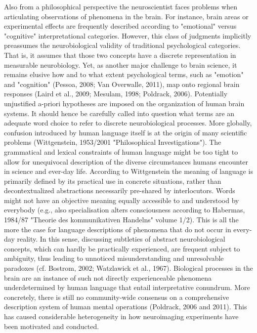 \documentclass[authoryear,review,3p]{elsarticle}
\begin{document}
Also from a philosophical perspective
the neuroscientist faces problems when articulating observations of
phenomena in the brain.
%
For instance, brain areas or experimental effects are frequently
described according to "emotional" versus "cognitive"
interpretational categories.
However, this class of judgments implicitly preassumes
the neurobiological validity of traditional psychological categories.
That is, it assumes that those two concepts have
a discrete representation in measurable neurobiology.
Yet, as another major challenge to brain science,
it remains elusive how and to what extent psychological terms,
such as "emotion" and "cognition" (Pessoa, 2008; Van Overwalle, 2011),
map onto regional brain responses
(Laird et al., 2009; Mesulam, 1998; Poldrack, 2006). 
Potentially unjustified a-priori hypotheses are imposed
on the organization of human brain systems.
%
It should hence be carefully called into question what terms
are an adequate word choice to refer to discrete
neurobiological processes.
More globally,
confusion introduced by human language itself is at the origin
of many scientific problems
(Wittgenstein, 1953/2001 "Philosophical Investigations").
The grammatical and lexical constraints of human language might be
too tight to allow for unequivocal description of the diverse
circumstances humans encounter in science and ever-day life.
According to Wittgenstein the meaning of language is primarily
defined by its practical use in concrete situations,
rather than decontextualized abstractions necessarily pre-shared
by interlocutors.
Words might not have an objective meaning
equally accessible to and understood by everybody
(e.g., also specialisation alters consciousness according to
Habermas, 1984/87 "Theorie des kommunikativen Handelns" volume 1/2).
This is all the more the case for language descriptions
of phenomena that do not occur in every-day reality.
In this sense,
discussing subtleties of abstract neurobiological concepts,
which can hardly be practically experienced,
are frequent subject to ambiguity, thus leading to
unnoticed misunderstanding and unresolvable paradoxes
(cf. Bostrom, 2002; Watzlawick et al., 1967).
Biological processes in the brain are an instance of
such not directly experienceable phenomena underdetermined
by human language that entail interpretative conundrum.
%
More concretely,
there is still no community-wide consensus on
a comprehensive description system of
human mental operations (Poldrack, 2006 and 2011).
This has caused considerable heterogeneity in
how neuroimaging experiments have been motivated and conducted.
\end{document}
